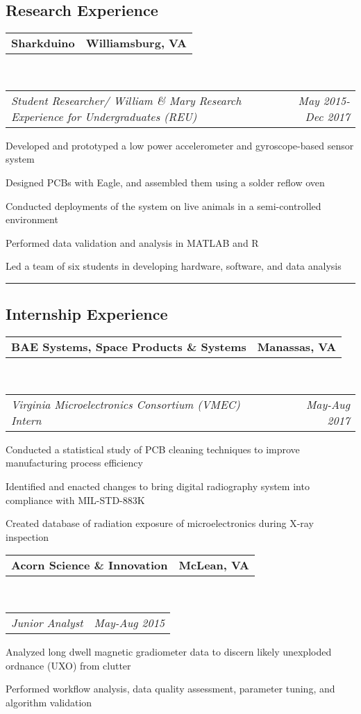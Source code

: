 \documentclass[10pt,letterpaper]{article}
\makeatletter
\newcommand{\headerrow}[2]
{\begin{tabular*}{\linewidth}{l@{\extracolsep{\fill}}r}
	#1 &
	#2 \\
\end{tabular*}}
\makeatother
\begin{document}
\subsection*{Research Experience}

	\headerrow
		{\textbf{Sharkduino}}
		{\textbf{Williamsburg, VA}}
	\\
	\headerrow
		{\emph{Student Researcher/ William \& Mary Research Experience for Undergraduates (REU)}}
		{\emph{May 2015-Dec 2017}}
	\begin{itemize*}
	\item Developed and prototyped a low power accelerometer and gyroscope-based sensor system
	\item Designed PCBs with Eagle, and assembled them using a solder reflow oven
	\item Conducted deployments of the system on live animals in a semi-controlled environment
	\item Performed data validation and analysis in MATLAB and R
	\item Led a team of six students in developing hardware, software, and data analysis
	\end{itemize*}
	
\hrule
\vspace{-0.4em}
\subsection*{Internship Experience}
\headerrow
		{\textbf{BAE Systems, Space Products \& Systems}}
		{\textbf{Manassas, VA}}
	\\
	\headerrow
		{\emph{Virginia Microelectronics Consortium (VMEC) Intern}}
		{\emph{May-Aug 2017}}
\begin{itemize*}
		\item Conducted a statistical study of PCB cleaning techniques to improve manufacturing process efficiency
		\item Identified and enacted changes to bring digital radiography system into compliance with MIL-STD-883K
		\item Created database of radiation exposure of microelectronics during X-ray inspection
	\end{itemize*}
	\headerrow
		{\textbf{Acorn Science \& Innovation}}
		{\textbf{McLean, VA}}
	\\
	\headerrow
		{\emph{Junior Analyst}}
		{\emph{May-Aug 2015}}
	\begin{itemize*}
		\item Analyzed long dwell magnetic gradiometer data to
			discern likely unexploded ordnance (UXO) from clutter
		\item Performed workflow analysis, data quality assessment, parameter tuning, and algorithm validation
	\end{itemize*}
	
\end{document}
